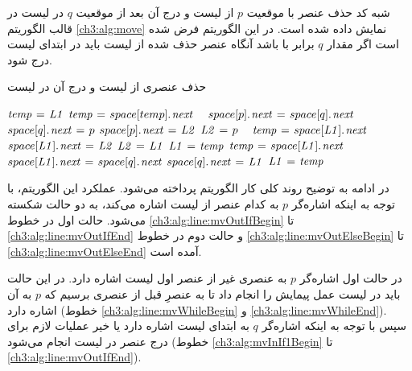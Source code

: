 {شبه کد حذف عنصر با موقعیت {$p$} از لیست {} و درج آن بعد از موقعیت {$q$} در لیست {} در قالب الگوریتم {\ref{ch3:alg:move}} نمایش داده شده است. در این الگوریتم فرض شده است اگر مقدار {$q$} برابر با {} باشد آنگاه عنصر حذف شده از لیست {} باید در ابتدای لیست {} درج شود.
\begin{algorithm}
\caption{حذف عنصری از لیست {} و درج آن در لیست {}}\label{ch3:alg:move}
\begin{latin}
\begin{algorithmic}[1]
		\label{ch3:alg:line:mvOutIfBegin}
				\State	$\mathit{temp} \mathrel{\hspace{1pt}=\hspace{1pt}} \mathit{L1}$
				\label{ch3:alg:line:mvWhileBegin}
						\State	$\mathit{temp} \mathrel{\hspace{1pt}=\hspace{1pt}} space[temp].\hspace*{1pt}\mathit{next}$
				\EndWhile\ \label{ch3:alg:line:mvWhileEnd}
				\label{ch3:alg:mvInIf1Begin}
						\State	$space[p].\hspace*{1pt}\mathit{next} \mathrel{\hspace{1pt}=\hspace{1pt}} space[q].\hspace*{1pt}\mathit{next}$
						\State	$space[q].\hspace*{1pt}\mathit{next} \mathrel{\hspace{1pt}=\hspace{1pt}} p$
				\Else
						\State	$space[p].\hspace*{1pt}\mathit{next} \mathrel{\hspace{1pt}=\hspace{1pt}} \mathit{L2}$
						\State	$\mathit{L2} \mathrel{\hspace{1pt}=\hspace{1pt}} p$
				\EndIf\ \label{ch3:alg:line:mvOutIfEnd}
		\Else
				\label{ch3:alg:line:mvOutElseBegin}
						\State	$\mathit{temp} \mathrel{\hspace{1pt}=\hspace{1pt}} space[\mathit{L1}].\hspace*{1pt}\mathit{next}$
						\State	$space[\mathit{L1}].\hspace*{1pt}\mathit{next} \mathrel{\hspace{1pt}=\hspace{1pt}} \mathit{L2}$
						\State	$\mathit{L2} \mathrel{\hspace{1pt}=\hspace{1pt}} \mathit{L1}$
						\State	$\mathit{L1} \mathrel{\hspace{1pt}=\hspace{1pt}} \mathit{temp}$
				\Else
						\State	$\mathit{temp} \mathrel{\hspace{1pt}=\hspace{1pt}} space[\mathit{L1}].\hspace*{1pt}\mathit{next}$
						\State	$space[\mathit{L1}].\hspace*{1pt}\mathit{next} \mathrel{\hspace{1pt}=\hspace{1pt}} space[q].\hspace*{1pt}\mathit{next}$
						\State	$space[q].\hspace*{1pt}\mathit{next} \mathrel{\hspace{1pt}=\hspace{1pt}} \mathit{L1}$
						\State	$\mathit{L1} \mathrel{\hspace{1pt}=\hspace{1pt}} \mathit{temp}$
				\EndIf
		\EndIf\ \label{ch3:alg:line:mvOutElseEnd}
\EndProcedure
\end{algorithmic}
\end{latin}
\end{algorithm}

در ادامه به توضیح روند کلی کار الگوریتم پرداخته می‌شود. عملکرد این الگوریتم، با توجه به اینکه اشاره‌گر {$p$} به کدام عنصر از لیست {} اشاره می‌کند، به دو حالت شکسته می‌شود. حالت اول در خطوط {\ref{ch3:alg:line:mvOutIfBegin}} تا {\ref{ch3:alg:line:mvOutIfEnd}} و حالت دوم در خطوط {\ref{ch3:alg:line:mvOutElseBegin}} تا {\ref{ch3:alg:line:mvOutElseEnd}} آمده است.

در حالت اول اشاره‌گر {$p$} به عنصری غیر از عنصر اول لیست {} اشاره دارد. در این حالت باید در لیست {} عمل پیمایش را انجام داد تا به عنصرِ قبل از عنصری برسیم که {$p$} به آن اشاره دارد (خطوط {\ref{ch3:alg:line:mvWhileBegin}} و {\ref{ch3:alg:line:mvWhileEnd}}). سپس با توجه به اینکه اشاره‌گر {$q$} به ابتدای لیست {} اشاره دارد یا خیر عملیات لازم برای درج عنصر در لیست {} انجام می‌شود (خطوط {\ref{ch3:alg:mvInIf1Begin}} تا {\ref{ch3:alg:line:mvOutIfEnd}}).

}
